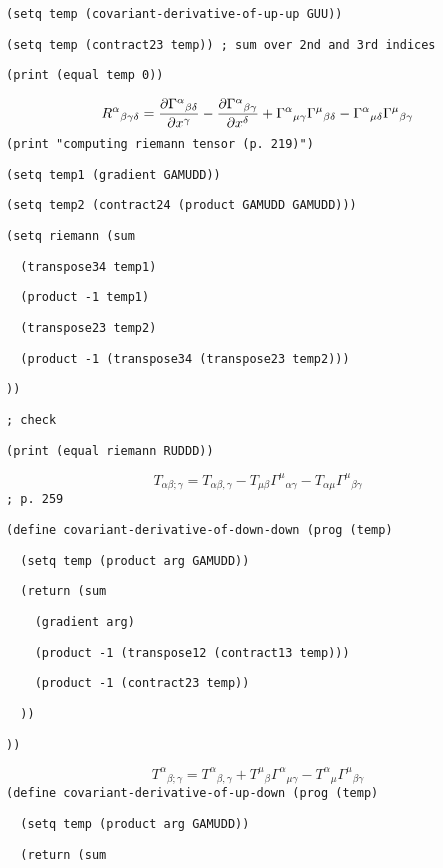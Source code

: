 {\tt (setq\ temp\ (covariant-derivative-of-up-up\ GUU))}

{\tt (setq\ temp\ (contract23\ temp))\ ;\ sum\ over\ 2nd\ and\ 3rd\ indices}

{\tt (print\ (equal\ temp\ 0))}

$${R^\alpha}_{\beta\gamma\delta}=
{\partial{\Gamma^\alpha}_{\beta\delta}\over\partial x^\gamma}-
{\partial{\Gamma^\alpha}_{\beta\gamma}\over\partial x^\delta}+
{\Gamma^\alpha}_{\mu\gamma}{\Gamma^\mu}_{\beta\delta}-
{\Gamma^\alpha}_{\mu\delta}{\Gamma^\mu}_{\beta\gamma}$$
{\tt (print\ "computing\ riemann\ tensor\ (p.\ 219)")}

{\tt (setq\ temp1\ (gradient\ GAMUDD))}

{\tt (setq\ temp2\ (contract24\ (product\ GAMUDD\ GAMUDD)))}

{\tt (setq\ riemann\ (sum}

{\tt \ \ (transpose34\ temp1)}

{\tt \ \ (product\ -1\ temp1)}

{\tt \ \ (transpose23\ temp2)}

{\tt \ \ (product\ -1\ (transpose34\ (transpose23\ temp2)))}

{\tt ))}

{\tt ;\ check}

{\tt (print\ (equal\ riemann\ RUDDD))}

$$T_{\alpha\beta;\gamma}=T_{\alpha\beta,\gamma}
-T_{\mu\beta}{\Gamma^\mu}_{\alpha\gamma}
-T_{\alpha\mu}{\Gamma^\mu}_{\beta\gamma}$$
{\tt ;\ p.\ 259}

{\tt (define\ covariant-derivative-of-down-down\ (prog\ (temp)}

{\tt \ \ (setq\ temp\ (product\ arg\ GAMUDD))}

{\tt \ \ (return\ (sum}

{\tt \ \ \ \ (gradient\ arg)}

{\tt \ \ \ \ (product\ -1\ (transpose12\ (contract13\ temp)))}

{\tt \ \ \ \ (product\ -1\ (contract23\ temp))}

{\tt \ \ ))}

{\tt ))}

$${T^\alpha}_{\beta;\gamma}={T^\alpha}_{\beta,\gamma}+
{T^\mu}_\beta{\Gamma^\alpha}_{\mu\gamma}-
{T^\alpha}_\mu{\Gamma^\mu}_{\beta\gamma}$$
{\tt (define\ covariant-derivative-of-up-down\ (prog\ (temp)}

{\tt \ \ (setq\ temp\ (product\ arg\ GAMUDD))}

{\tt \ \ (return\ (sum}

